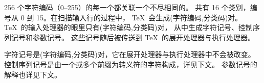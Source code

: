 \documentclass{book}
\begin{document}
256 个字符编码（0--255）的每一个都关联一个不尽相同的。
共有 16 个类别，编号从 0 到 15。在扫描输入行的过程中，
\TeX\ 会生成(字符编码,分类码)对。\TeX\ 的输入处理器的眼里只有(字符编码,分类码)对，
从中生成字符记号、控制序列记号和参数记号。
这些记号随后被传送到 \TeX\ 的展开处理器与执行处理器。

字符记号是(字符编码,分类码)对，它在展开处理器与执行处理器中不会被改变。
控制序列记号是由一个或多个前缀为转义符的字符构成，详见下文。
参数记号的解释也详见下文。
\end{document}
